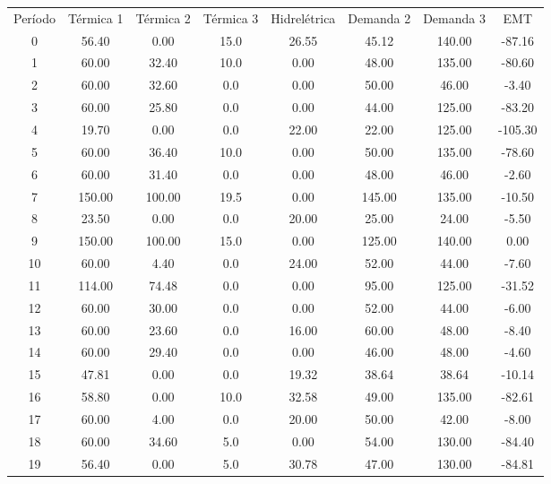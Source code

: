 \documentclass[a4paper,12pt,twoside]{article}
\begin{document}
\begin{center}
    \begin{tabular}{ c c c c c c c c }
        Período & Térmica 1  & Térmica 2  & Térmica 3  & Hidrelétrica  & Demanda 2  & Demanda 3      & EMT \\
        0    & 56.40     & 0.00     & 15.0  & 26.55   & 45.12  & 140.00  & -87.16 \\
        1    & 60.00    & 32.40     & 10.0   & 0.00   & 48.00  & 135.00  & -80.60 \\
        2    & 60.00    & 32.60      & 0.0   & 0.00   & 50.00   & 46.00   & -3.40 \\
        3    & 60.00    & 25.80      & 0.0   & 0.00   & 44.00  & 125.00  & -83.20 \\
        4    & 19.70     & 0.00      & 0.0  & 22.00   & 22.00  & 125.00 & -105.30 \\
        5    & 60.00    & 36.40     & 10.0   & 0.00   & 50.00  & 135.00  & -78.60 \\
        6    & 60.00    & 31.40      & 0.0   & 0.00   & 48.00   & 46.00   & -2.60 \\
        7   & 150.00   & 100.00     & 19.5   & 0.00  & 145.00  & 135.00  & -10.50 \\
        8    & 23.50     & 0.00      & 0.0  & 20.00   & 25.00   & 24.00   & -5.50 \\
        9   & 150.00   & 100.00     & 15.0   & 0.00  & 125.00  & 140.00    & 0.00 \\
        10   & 60.00     & 4.40      & 0.0  & 24.00   & 52.00   & 44.00   & -7.60 \\
        11  & 114.00    & 74.48      & 0.0   & 0.00   & 95.00  & 125.00  & -31.52 \\
        12   & 60.00    & 30.00      & 0.0   & 0.00   & 52.00   & 44.00   & -6.00 \\
        13   & 60.00    & 23.60      & 0.0  & 16.00   & 60.00   & 48.00   & -8.40 \\
        14   & 60.00    & 29.40      & 0.0   & 0.00   & 46.00   & 48.00   & -4.60 \\
        15   & 47.81     & 0.00      & 0.0  & 19.32   & 38.64   & 38.64  & -10.14 \\
        16   & 58.80     & 0.00     & 10.0  & 32.58   & 49.00  & 135.00  & -82.61 \\
        17   & 60.00     & 4.00      & 0.0  & 20.00   & 50.00   & 42.00   & -8.00 \\
        18   & 60.00    & 34.60      & 5.0   & 0.00   & 54.00  & 130.00  & -84.40 \\
        19   & 56.40     & 0.00      & 5.0  & 30.78   & 47.00  & 130.00  & -84.81
    \end{tabular}
\end{center}
\end{document}
